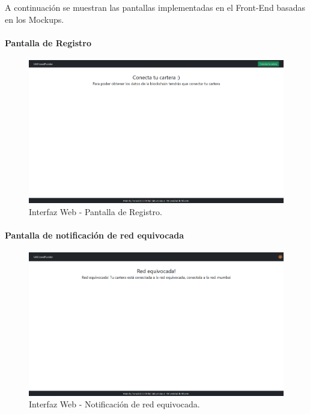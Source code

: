 \newpage

A continuación se muestran las pantallas implementadas en el Front-End basadas en los Mockups.

\bigskip

\paragraph{Pantalla de Registro}
\begin{figure}[H]
        \centering
        \includegraphics[width=1\textwidth]{img/interfaz/pantalla_registro.png}
        \caption{Interfaz Web - Pantalla de Registro.}
        \label{fig:configApi}
\end{figure}

\paragraph{Pantalla de notificación de red equivocada}
\begin{figure}[H]
        \centering
        \includegraphics[width=1\textwidth]{img/interfaz/red_equivocada.png}
        \caption{Interfaz Web - Notificación de red equivocada.}
        \label{fig:configApi}
\end{figure}

